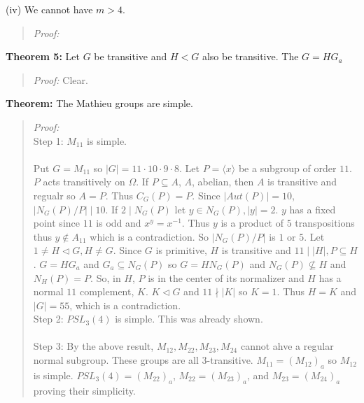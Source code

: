 (iv) We cannot have $m>4$.
\begin{quote}
\emph{Proof:}
\end{quote}
{\bf Theorem 5:}  Let $G$ be transitive and $H < G$ also be transitive.  The $G= H G_a$
\begin{quote}
\emph{Proof:}
Clear.
\end{quote}
{\bf Theorem:}  The Mathieu groups are simple.
\begin{quote}
\emph{Proof:}
\\
Step 1: $M_{11}$ is simple.\\
\\
Put $G = M_{11}$ so $|G| = 11 \cdot 10 \cdot 9 \cdot 8$.  Let $P=\langle x\rangle$ be a subgroup of order
$11$. $P$ acts transitively on $\Omega$.  If $P \subseteq A$, $A$, abelian, then $A$ is transitive and regualr so
$A=P$.  Thus $C_G(P)=P$.  Since $|Aut(P)|=10$, $|N_G(P)/P| \mid 10$.
If $2 \mid N_G(P)$ let $y \in N_G(P), |y|=2$. $y$ has a fixed point since $11$ is odd and $x^y = x^{-1}$.  Thus
$y$ is a product of $5$ transpositions thus $y \notin A_{11}$ which is a contradiction.  So $|N_G(P)/P|$ is $1$ or $5$.
Let $1 \ne H \lhd G, H \ne G$.  Since $G$ is primitive, $H$ is transitive and $11 \mid |H|, P \subseteq H$.
$G= H G_a$ and $G_a \subseteq N_G(P)$ so $G= H N_G(P)$ and $N_G(P) \nsubseteq H$ and $N_H(P)=P$.  So, in $H$,
$P$ is in the center of its normalizer and $H$ has a normal $11$ complement, $K$.  $K \lhd G$ and $11 \nmid |K|$ so
$K = 1$.  Thus $H=K$ and $|G|=55$, which is a contradiction.
\\
Step 2:  $PSL_3(4)$ is simple. This was already shown.
\\
\\
Step 3:
By the above result, $M_{12}, M_{22}, M_{23}, M_{24}$ cannot ahve a regular normal subgroup.
These groups are all $3$-transitive.  $M_{11} = (M_{12})_a$ so $M_{12}$ is simple.
$PSL_3(4)  = (M_{22})_a$, $M_{22} = (M_{23})_a$, and $M_{23} = (M_{24})_a$ proving their simplicity.
\end{quote}
